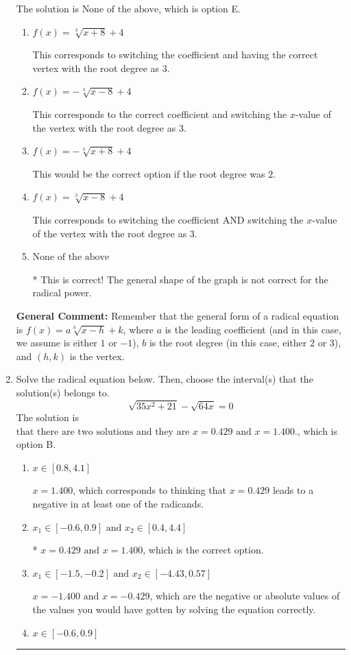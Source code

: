 \documentclass{extbook}[14pt]
\newcommand{\litem}[1]{\item #1

\rule{\textwidth}{0.4pt}}
\begin{document}
\begin{enumerate}
{The solution is \( \text{None of the above} \), which is option E.\begin{enumerate}[label=\Alph*.]
\item \( f(x) = \sqrt[3]{x + 8} + 4 \)

This corresponds to switching the coefficient and having the correct vertex with the root degree as $3$.
\item \( f(x) = - \sqrt[3]{x - 8} + 4 \)

This corresponds to the correct coefficient and switching the $x$-value of the vertex with the root degree as $3$.
\item \( f(x) = - \sqrt[3]{x + 8} + 4 \)

This would be the correct option if the root degree was $2$.
\item \( f(x) = \sqrt[3]{x - 8} + 4 \)

This corresponds to switching the coefficient AND switching the $x$-value of the vertex with the root degree as $3$.
\item \( \text{None of the above} \)

* This is correct! The general shape of the graph is not correct for the radical power.
\end{enumerate}

\textbf{General Comment:} Remember that the general form of a radical equation is $ f(x) = a \sqrt[b]{x - h} + k$, where $a$ is the leading coefficient (and in this case, we assume is either $1$ or $-1$), $b$ is the root degree (in this case, either $2$ or $3$), and $(h, k)$ is the vertex.
}
\litem{
Solve the radical equation below. Then, choose the interval(s) that the solution(s) belongs to.
\[ \sqrt{35 x^2 + 21} - \sqrt{64 x} = 0 \]
The solution is \( \text{that there are two solutions and they are } x = 0.429 \text{ and } x = 1.400. \), which is option B.\begin{enumerate}[label=\Alph*.]
\item \( x \in [0.8,4.1] \)

$x = 1.400$, which corresponds to thinking that $x = 0.429$ leads to a negative in at least one of the radicands.
\item \( x_1 \in [-0.6, 0.9] \text{ and } x_2 \in [0.4,4.4] \)

* $x = 0.429 \text{ and } x = 1.400$, which is the correct option.
\item \( x_1 \in [-1.5, -0.2] \text{ and } x_2 \in [-4.43,0.57] \)

$x = -1.400 \text{ and } x = -0.429$, which are the negative or absolute values of the values you would have gotten by solving the equation correctly.
\item \( x \in [-0.6,0.9] \)


\end{enumerate}}
\end{enumerate}
\end{document}
